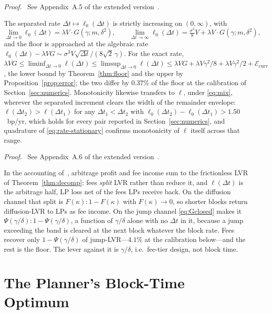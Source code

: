 \documentclass[runningheads]{llncs}
\newcommand{\dt}{\Delta t}
\newcommand{\1}{\mathbf{1}}
\newif\ifextended
\newcommand{\deferproof}[1]{%
  \par\smallskip\noindent\textit{Proof.}\ \ifextended
  See Appendix~#1.\else
  See Appendix~#1 of the extended version~\cite{bundi2026ext}.\fi\par\smallskip}
\begin{document}
\deferproof{A.5}

\begin{corollary}\label{cor:floor}
The separated rate $\dt \mapsto \ell_0(\dt)$ is strictly increasing on $(0,\infty)$, with
\[
\lim_{\dt\to 0} \ell_0(\dt) = \lambda V \cdot G(\gamma; m, \delta^2), \qquad
\lim_{\dt\to\infty} \ell_0(\dt) = \tfrac{\sigma^2}{8}V + \lambda V \cdot G(\gamma; m, \delta^2),
\]
and the floor is approached at the algebraic rate $\ell_0(\dt) - \lambda VG \sim \sigma^3V\sqrt{\dt}/(8\sqrt2\,\gamma)$. For the exact rate, $\lambda VG \le \liminf_{\dt\to0}\ell(\dt) \le \limsup_{\dt\to0}\ell(\dt) \le \lambda VG + \lambda V\gamma^2/8 + \lambda V\gamma^2/2 + \mathcal{E}_{\mathrm{curv}}$, the lower bound by Theorem~\ref{thm:floor} and the upper by Proposition~\ref{prop:error}; the two differ by $0.37\%$ of the floor at the calibration of Section~\ref{sec:numerics}. Monotonicity likewise transfers to $\ell$, under \eqref{eq:mix}, wherever the separated increment clears the width of the remainder envelope: $\ell(\dt_2)>\ell(\dt_1)$ for any $\dt_1<\dt_2$ with $\ell_0(\dt_2)-\ell_0(\dt_1) > 1.50$~bp/yr, which holds for every pair reported in Section~\ref{sec:numerics}, and quadrature of \eqref{eq:rate-stationary} confirms monotonicity of $\ell$ itself across that range.
\end{corollary}

\deferproof{A.6}

\begin{remark}\label{rem:feerecovery}
In the accounting of~\cite[Thms.~3--4]{milionis2023automated}, arbitrage profit and fee income sum to the frictionless LVR of Theorem~\ref{thm:decomp}: fees \emph{split} LVR rather than reduce it, and $\ell(\dt)$ is the arbitrage half, LP loss net of the fees LPs receive back. On the diffusion channel that split is $F(\kappa):1-F(\kappa)$ with $F(\kappa)\to0$, so shorter blocks return diffusion-LVR to LPs as fee income. On the jump channel \eqref{eq:Gclosed} makes it $\Psi(\gamma/\delta):1-\Psi(\gamma/\delta)$, a function of $\gamma/\delta$ alone with no $\dt$ in it, because a jump exceeding the band is cleared at the next block whatever the block rate. Fees recover only $1-\Psi(\gamma/\delta)$ of jump-LVR---$4.1\%$ at the calibration below---and the rest is the floor. The lever against it is $\gamma/\delta$, i.e.\ fee-tier design, not block time.
\end{remark}

\section{The Planner's Block-Time Optimum}\label{sec:opt}
\end{document}
